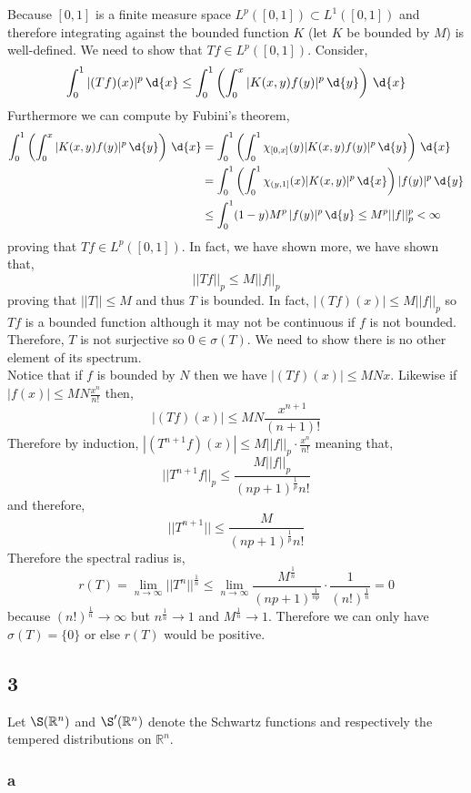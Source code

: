 \documentclass[12pt]{article}
\newcommand{\R}{\mathbb{R}}
\begin{document}
Because $[0,1]$ is a finite measure space $L^p([0,1]) \subset L^1([0,1])$ and therefore integrating against the bounded function $K$ (let $K$ be bounded by $M$) is well-defined. We need to show that $T f \in L^p([0, 1])$. Consider,
\[ \int_0^1 |(T f)(x)|^p \, \d{x} \le \int_0^1 \left( \int_0^x |K(x,y) f(y)|^p \, \d{y} \right) \, \d{x} \]
Furthermore we can compute by Fubini's theorem,
\begin{align*}
\int_0^1 \left( \int_0^x |K(x,y) f(y)|^p \, \d{y} \right) \, \d{x} & = \int_0^1 \left( \int_0^1 \chi_{[0, x]}(y) |K(x,y) f(y)|^p \, \d{y} \right) \, \d{x}
\\
& = \int_0^1 \left( \int_0^1 \chi_{(y, 1]}(x) |K(x,y)|^p \, \d{x} \right) |f(y)|^p \, \d{y} 
\\
& \le \int_0^1 (1 - y) M^p \, |f(y)|^p \, \d{y} \le M^p || f ||_p^p < \infty
\end{align*}
proving that $T f \in L^p([0,1])$. In fact, we have shown more, we have shown that,
\[ || T f ||_p \le M || f ||_p \]
proving that $|| T || \le M$ and thus $T$ is bounded. In fact, $| (T f)(x) | \le M || f ||_p$ so $T f$ is a bounded function although it may not be continuous if $f$ is not bounded. Therefore, $T$ is not surjective so $0 \in \sigma(T)$. We need to show there is no other element of its spectrum. 
\bigskip\\
Notice that if $f$ is bounded by $N$ then we have $| (T f)(x) | \le M N x$. Likewise if $|f(x)| \le MN \frac{x^n}{n!}$ then,
\[ | (T f)(x) | \le MN \frac{x^{n+1}}{(n+1)!} \]
Therefore by induction, $| (T^{n+1} f)(x) | \le M || f ||_p \cdot \frac{x^n}{n!}$ meaning that,
\[ || T^{n+1} f ||_p \le \frac{M || f ||_p}{(n p + 1)^{\frac{1}{p}} n!} \]
and therefore,
\[ || T^{n+1} || \le \frac{M}{(n p + 1)^{\frac{1}{p}} n!} \]
Therefore the spectral radius is,
\[ r(T) = \lim_{n \to \infty} || T^n ||^{\frac{1}{n}} \le \lim_{n \to \infty} \frac{M^{\frac{1}{n}}}{(n p + 1)^{\frac{1}{np}}} \cdot \frac{1}{(n!)^{\frac{1}{n}}} = 0 \]
because $(n!)^{\frac{1}{n}} \to \infty$ but $n^{\frac{1}{n}} \to 1$ and $M^{\frac{1}{n}} \to 1$. Therefore we can only have $\sigma(T) = \{ 0 \}$ or else $r(T)$ would be positive.

\subsection{3}

Let $\S(\R^n)$ and $\S'(\R^n)$ denote the Schwartz functions and respectively the tempered distributions on $\R^n$.

\subsubsection{a}
\end{document}
